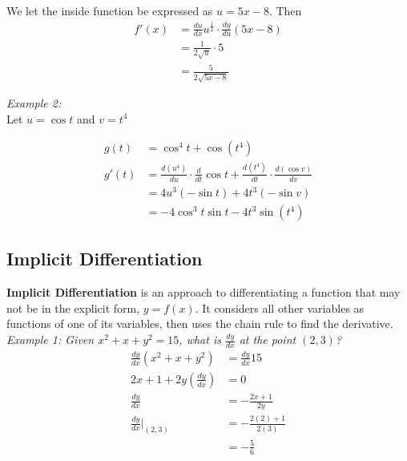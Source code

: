 \documentclass{article}
\begin{document}
            \noindent We let the inside function be expressed as $u=5x-8$. Then \\

            \begin{align*}
                f'(x) &= \frac{du}{dx}u^{\frac{1}{2}}\cdot\frac{dy}{du}(5x-8) \\
                &= \frac{1}{2\sqrt{u}}\cdot 5 \\
                &= \frac{5}{2\sqrt{5x-8}}
            \end{align*}

            \noindent \color{blue} \textit{Example 2:} \color{black} \\
            \noindent Let $u=\cos{t}$ and $v=t^4$

            \begin{align*}
                g(t) &= \cos^4{t} + \cos{(t^4)} \\
                g'(t) &= \frac{d(u^4)}{du} \cdot \frac{d}{dt}\cos{t}
                +
                \frac{d(t^4)}{dt} \cdot \frac{d(\cos{v})}{dv} \\
                &= 4u^3(-\sin{t}) + 4t^3(-\sin{v}) \\
                &= -4\cos^3{t}\sin{t} - 4t^3\sin{(t^4)}
            \end{align*}

        \subsection{Implicit Differentiation}
            \color{purple} \textbf{Implicit Differentiation} \color{black} is an approach to
            differentiating a function that may not be in the explicit form, $y=f(x)$. It
            considers all other variables as functions of one of its variables, then uses the
            chain rule to find the derivative. \\

            \noindent \color{blue} \textit{Example 1: Given $x^2+x+y^2=15$, what is $\frac{dy}{dx}$
            at the point $(2,3)$?} \color{black} \\

            \begin{align*}
                \frac{dy}{dx}(x^2+x+y^2) &= \frac{dy}{dx}15 \\
                2x + 1 + 2y\left(\frac{dy}{dx}\right) &= 0 \\
                \frac{dy}{dx} &= -\frac{2x+1}{2y} \\
                \frac{dy}{dx}\Bigr|_{(2,3)} &= -\frac{2(2)+1}{2(3)} \\
                &= -\frac{5}{6}
            \end{align*}
\end{document}
